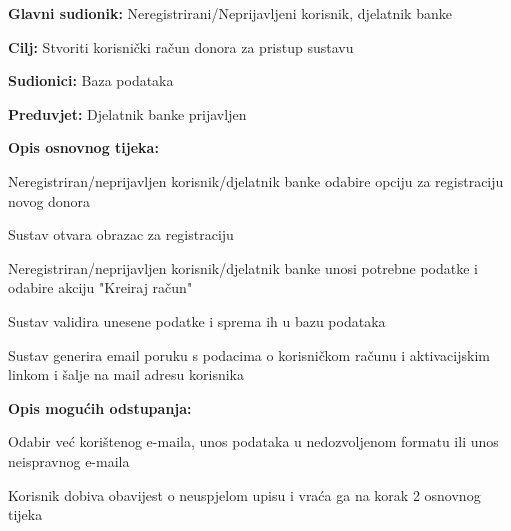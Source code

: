 \noindent {}
					\begin{packed_item}
	
						\item \textbf{Glavni sudionik: }Neregistrirani/Neprijavljeni korisnik, djelatnik banke
						\item \textbf{Cilj:} Stvoriti korisnički račun donora za pristup sustavu
						\item \textbf{Sudionici:} Baza podataka
						\item \textbf{Preduvjet:} Djelatnik banke prijavljen 
						\item \textbf{Opis osnovnog tijeka:}
						
						\item[] \begin{packed_enum}
	
							\item Neregistriran/neprijavljen korisnik/djelatnik banke odabire opciju za registraciju novog donora
							\item Sustav otvara obrazac za registraciju
							\item Neregistriran/neprijavljen korisnik/djelatnik banke unosi potrebne podatke i odabire akciju "Kreiraj račun" 
							\item Sustav validira unesene podatke i sprema ih u bazu podataka
							\item Sustav generira email poruku s podacima o korisničkom računu i aktivacijskim linkom i šalje na mail adresu korisnika
							
						\end{packed_enum}
						
						\item  \textbf{Opis mogućih odstupanja:}
						
						\item[] \begin{packed_item}
	
							\item[2.a] Odabir već korištenog e-maila, unos podataka u nedozvoljenom formatu ili unos neispravnog e-maila
							\item[] \begin{packed_enum}
								
								\item Korisnik dobiva obavijest o neuspjelom upisu i vraća ga na korak 2 osnovnog tijeka
								
							\end{packed_enum}
							
							
						\end{packed_item}
					\end{packed_item}

